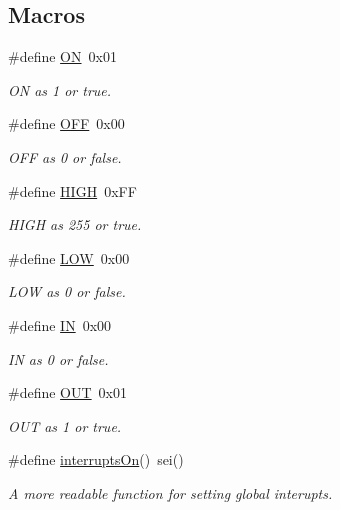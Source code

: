 \subsection*{Macros}
\begin{DoxyCompactItemize}
\item 
\#define \hyperlink{a00011_ad76d1750a6cdeebd506bfcd6752554d2}{O\-N}~0x01
\begin{DoxyCompactList}\small\item\em O\-N as 1 or true. \end{DoxyCompactList}\item 
\#define \hyperlink{a00011_a29e413f6725b2ba32d165ffaa35b01e5}{O\-F\-F}~0x00
\begin{DoxyCompactList}\small\item\em O\-F\-F as 0 or false. \end{DoxyCompactList}\item 
\#define \hyperlink{a00011_a5bb885982ff66a2e0a0a45a8ee9c35e2}{H\-I\-G\-H}~0x\-F\-F
\begin{DoxyCompactList}\small\item\em H\-I\-G\-H as 255 or true. \end{DoxyCompactList}\item 
\#define \hyperlink{a00011_ab811d8c6ff3a505312d3276590444289}{L\-O\-W}~0x00
\begin{DoxyCompactList}\small\item\em L\-O\-W as 0 or false. \end{DoxyCompactList}\item 
\#define \hyperlink{a00011_ac2bbd6d630a06a980d9a92ddb9a49928}{I\-N}~0x00
\begin{DoxyCompactList}\small\item\em I\-N as 0 or false. \end{DoxyCompactList}\item 
\#define \hyperlink{a00011_aec78e7a9e90a406a56f859ee456e8eae}{O\-U\-T}~0x01
\begin{DoxyCompactList}\small\item\em O\-U\-T as 1 or true. \end{DoxyCompactList}\item 
\#define \hyperlink{a00011_aaf09d20270f512294e9fbb94369c11f0}{interrupts\-On}()~sei()
\begin{DoxyCompactList}\small\item\em A more readable function for setting global interupts. \end{DoxyCompactList}\item 

\end{DoxyCompactItemize}
